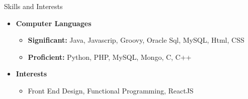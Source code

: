\documentclass[11pt.oneside]{article}
\newenvironment{ressection}[1]{
    \vspace{4pt}
    {\fontfamily{phv}\selectfont\Large#1}
    \begin{itemize}
    \vspace{3pt} 
}{
    \end{itemize}
}
\newcommand{\resitem}[1]{
    \vspace{-4pt}
    \item \begin{flushleft}#1 \end{flushleft}
}
\newcommand{\ressubitem}[1]{
    \vspace{-1pt}
    \item \begin{flushleft}#1 \end{flushleft}
}
\newenvironment{reslist}[1]{
    \resitem{\textbf{#1}}
    \vspace{-5pt}
    \begin{itemize}
}{
    \end{itemize}
}
\begin{document}
\begin{ressection}{Skills and Interests}
    \begin{reslist}{Computer Languages}
        \ressubitem{\textbf{Significant:} Java, Javascrip, Groovy, Oracle Sql, MySQL, Html, CSS}
        \ressubitem{\textbf{Proficient:} Python, PHP, MySQL, Mongo, C, C++}
    \end{reslist}
    \begin{reslist}{Interests}
        \ressubitem{Front End Design, Functional Programming, ReactJS}
    \end{reslist}
\end{ressection}
\end{document}
